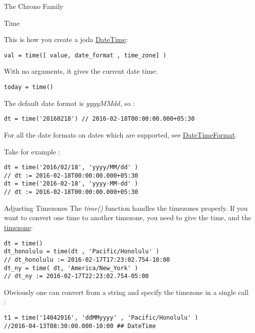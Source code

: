 \begin{section}{The Chrono Family}
\begin{subsection}{Time}

This is how you create a joda \href{http://joda-time.sourceforge.net/apidocs/org/joda/time/DateTime.html}{DateTime}:
\begin{lstlisting}[style=JexlStyle]
val = time([ value, date_format , time_zone] )
\end{lstlisting}

With no arguments, it gives the current date time:

\begin{lstlisting}[style=JexlStyle]
today = time()
\end{lstlisting}

The default date format is $yyyyMMdd$, so :
\begin{lstlisting}[style=JexlStyle]
dt = time('20160218') // 2016-02-18T00:00:00.000+05:30
\end{lstlisting}

For all the date formats on dates which are supported, 
see \href{http://www.joda.org/joda-time/apidocs/org/joda/time/format/DateTimeFormat.html}{DateTimeFormat}.

Take for example :

\begin{lstlisting}[style=JexlStyle]
dt = time('2016/02/18', 'yyyy/MM/dd' ) 
// dt := 2016-02-18T00:00:00.000+05:30
dt = time('2016-02-18', 'yyyy-MM-dd' ) 
// dt := 2016-02-18T00:00:00.000+05:30
\end{lstlisting}
\end{subsection}

\begin{subsection}{Adjusting Timezones}
The \emph{time()} function handles the timezones properly.
If you want to convert one time to another timezone, you need to give the time, 
and the \href{http://joda-time.sourceforge.net/timezones.html}{timezone}:

\begin{lstlisting}[style=JexlStyle]
dt = time()
dt_honolulu = time(dt , 'Pacific/Honolulu' ) 
// dt_honolulu := 2016-02-17T17:23:02.754-10:00 
dt_ny = time( dt, 'America/New_York' ) 
// dt_ny := 2016-02-17T22:23:02.754-05:00
\end{lstlisting}

Obviously one can convert from a string and specify the timezone 
in a single call :

\begin{lstlisting}[style=JexlStyle]
t1 = time('14042016', 'ddMMyyyy' , 'Pacific/Honolulu' )
//2016-04-13T08:30:00.000-10:00 ## DateTime
\end{lstlisting}


\end{subsection}
\end{section}
